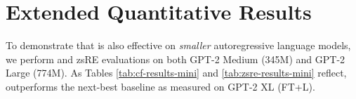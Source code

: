 \section{Extended Quantitative Results} \label{apd:smaller-model-results}




To demonstrate that \method is also effective on \textit{smaller} autoregressive language models, we perform \cfd and zsRE evaluations on both GPT-2 Medium (345M) and GPT-2 Large (774M). As Tables \ref{tab:cf-results-mini} and \ref{tab:zsre-results-mini} reflect, \method outperforms the next-best baseline as measured on GPT-2 XL (FT+L).
